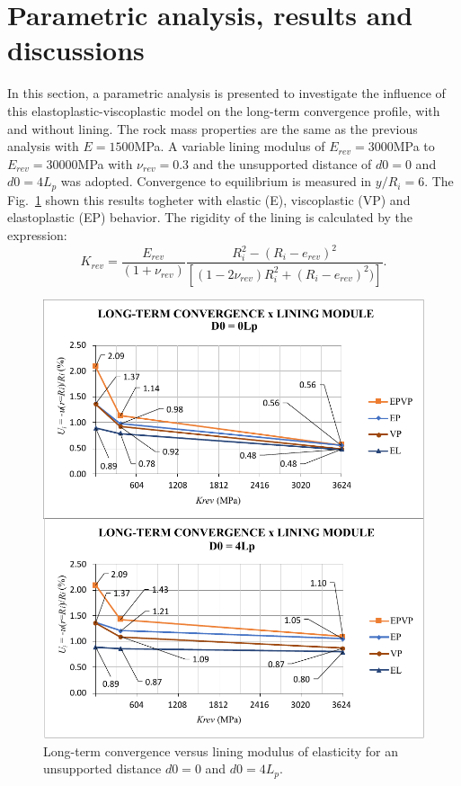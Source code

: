 \documentclass[Journal,letterpaper]{ascelike-new}
\begin{document}
\section{Parametric analysis, results and discussions}

In this section, a parametric analysis is presented to investigate the influence of this elastoplastic-viscoplastic model on the long-term convergence profile, with and without lining. The rock mass properties are the same as the previous analysis with $E=1500$MPa. A variable lining modulus of $E_{rev} = 3000$MPa to $E_{rev} = 30000$MPa with $\nu_{rev} = 0.3$ and the unsupported distance of $d0 = 0$ and $d0 = 4L_p$ was adopted. Convergence to equilibrium is measured in $y/R_i = 6$. The Fig.~\ref{convergence_lining_module} shown this results togheter with elastic (E), viscoplastic (VP) and elastoplastic (EP) behavior. The rigidity of the lining is calculated by the expression:
\begin{equation}
	\label{rigidez_revestimento}
	K_{rev} = \dfrac{E_{rev}}{(1+\nu_{rev})}\dfrac{R_i^2-(R_i-e_{rev})^2}{\left[(1-2\nu_{rev})R_i^2+(R_i-e_{rev})^2)\right]}.
\end{equation}


\begin{figure}
	\centering
	\includegraphics[scale = 1.0]{FIG7.pdf}
	\caption{\label{convergence_lining_module}Long-term convergence versus lining modulus of elasticity for an unsupported distance $d0=0$ and $d0=4L_p$.}
\end{figure}
\end{document}
